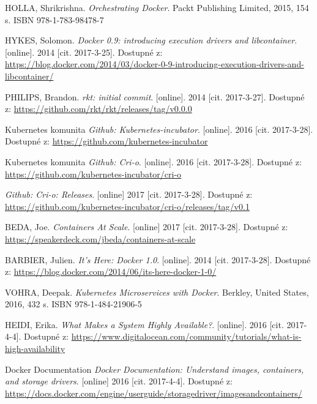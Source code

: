 \begin{thebibliography}{10}
 HOLLA, Shrikrishna. 
  \emph{Orchestrating Docker}. Packt Publishing Limited, 2015, 154 s. ISBN 978-1-783-98478-7


 HYKES, Solomon.
	\emph{Docker 0.9: introducing execution drivers and libcontainer}. {[}online]. 2014 {[}cit. 2017-3-25]. Dostupné z: \url{https://blog.docker.com/2014/03/docker-0-9-introducing-execution-drivers-and-libcontainer/}

 PHILIPS, Brandon.
	\emph{rkt: initial commit}. {[}online]. 2014 {[}cit. 2017-3-27]. Dostupné z: \url{https://github.com/rkt/rkt/releases/tag/v0.0.0}

Kubernetes komunita
	\emph{Github: Kubernetes-incubator}. {[}online]. 2016 {[}cit. 2017-3-28]. Dostupné z: \url{https://github.com/kubernetes-incubator}

Kubernetes komunita
	\emph{Github: Cri-o}. {[}online]. 2016 {[}cit. 2017-3-28]. Dostupné z: \url{https://github.com/kubernetes-incubator/cri-o}

	\emph{Github: Cri-o: Releases}. {[}online] 2017 {[}cit. 2017-3-28]. Dostupné z: \url{https://github.com/kubernetes-incubator/cri-o/releases/tag/v0.1}


BEDA, Joe.
	\emph{Containers At Scale}. {[}online] 2017 {[}cit. 2017-3-28]. Dostupné z: \url{https://speakerdeck.com/jbeda/containers-at-scale}	

BARBIER, Julien.
	\emph{It’s Here: Docker 1.0}. {[}online]. 2014 {[}cit. 2017-3-28]. Dostupné z: \url{https://blog.docker.com/2014/06/its-here-docker-1-0/}

 VOHRA, Deepak. 
  \emph{Kubernetes Microservices with Docker}. Berkley, United States, 2016, 432 s. ISBN 978-1-484-21906-5

HEIDI, Erika.
	\emph{What Makes a System Highly Available?}. {[}online]. 2016 {[}cit. 2017-4-4]. Dostupné z: \url{https://www.digitalocean.com/community/tutorials/what-is-high-availability}

 Docker Documentation
	\emph{Docker Documentation: Understand images, containers, and storage drivers}. {[}online] 2016 {[}cit. 2017-4-4]. Dostupné z: \url{https://docs.docker.com/engine/userguide/storagedriver/imagesandcontainers/}


\end{thebibliography}
